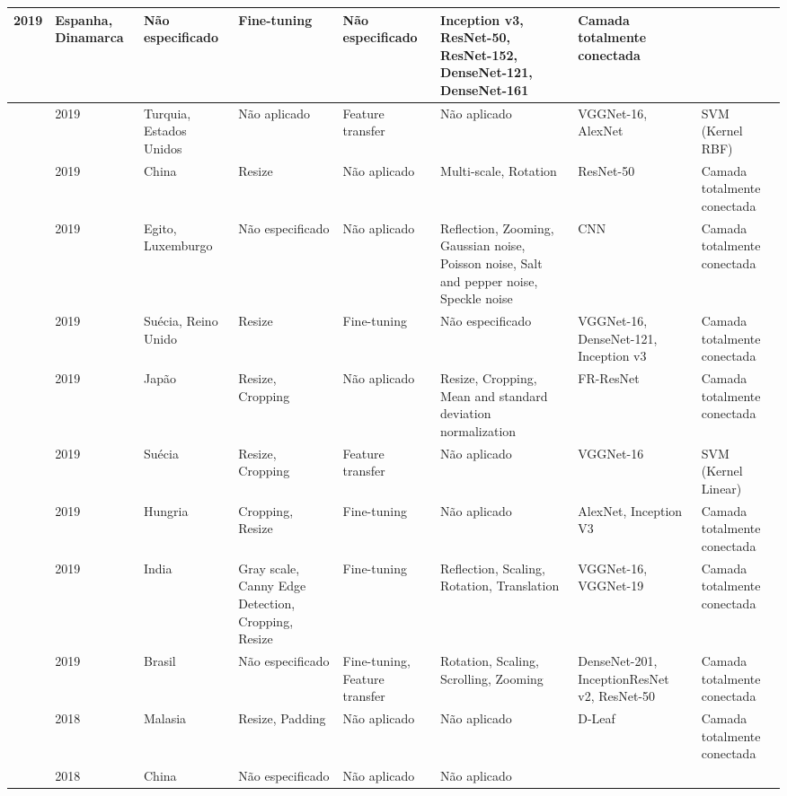 \documentclass[
	12pt,				%
	oneside,			%
	a4paper,			%
	english,			%
	brazil				%
	]{abntex2ppgsi}
\begin{document}
\begin{landscape}
\begin{OnehalfSpacing}
\begin{footnotesize}
\begin{longtable}{|p{2.3cm}|p{1.3cm}|p{2cm}|p{2.6cm}|p{2.4cm}|p{4.3cm}|p{4.3cm}|p{2.5cm}|}
  2019 &
  Espanha, Dinamarca &
  Não especificado &
  Fine-tuning &
  Não especificado &
  Inception v3, ResNet-50, ResNet-152, DenseNet-121, DenseNet-161 &
  Camada totalmente conectada \\ \hline
\cite{cibuk2019efficient} &
  2019 &
  Turquia, Estados Unidos &
  Não aplicado &
  Feature transfer &
  Não aplicado &
  VGGNet-16, AlexNet &
  SVM (Kernel RBF) \\ \hline
\cite{li2019effective} &
  2019 &
  China &
  Resize &
  Não aplicado &
  Multi-scale, Rotation &
  ResNet-50 &
  Camada totalmente conectada \\ \hline
\cite{khalifa2019deep} &
  2019 &
  Egito, Luxemburgo &
  Não especificado &
  Não aplicado &
  Reflection, Zooming, Gaussian noise, Poisson noise, Salt and pepper noise, Speckle noise &
  CNN &
  Camada totalmente conectada \\ \hline
\cite{hsiang2019endless} &
  2019 &
  Suécia, Reino Unido &
  Resize &
  Fine-tuning &
  Não especificado &
  VGGNet-16, DenseNet-121, Inception v3 &
  Camada totalmente conectada \\ \hline
\cite{ren2019feature} &
  2019 &
  Japão &
  Resize, Cropping &
  Não aplicado &
  Resize, Cropping, Mean and standard deviation normalization &
  FR-ResNet &
  Camada totalmente conectada \\ \hline
\cite{valan2019automated} &
  2019 &
  Suécia &
  Resize, Cropping &
  Feature transfer &
  Não aplicado &
  VGGNet-16 &
  SVM (Kernel Linear) \\ \hline
\cite{gyires2019deep} &
  2019 &
  Hungria &
  Cropping, Resize &
  Fine-tuning &
  Não aplicado &
  AlexNet, Inception V3 &
  Camada totalmente conectada \\ \hline
\cite{thenmozhi2019crop} &
  2019 &
  India &
  Gray scale, Canny Edge Detection, Cropping, Resize &
  Fine-tuning &
  Reflection, Scaling, Rotation, Translation &
  VGGNet-16, VGGNet-19 &
  Camada totalmente conectada \\ \hline
\cite{tetila2019deep} &
  2019 &
  Brasil &
  Não especificado &
  Fine-tuning, Feature transfer &
  Rotation, Scaling, Scrolling, Zooming &
  DenseNet-201, InceptionResNet v2, ResNet-50 &
  Camada totalmente conectada \\ \hline
\cite{wei2018deep} &
  2018 &
  Malasia &
  Resize, Padding &
  Não aplicado &
  Não aplicado &
  D-Leaf &
  Camada totalmente conectada \\ \hline
\cite{zhu2018method} &
  2018 &
  China &
  Não especificado &
  Não aplicado &
  Não aplicado &

\end{longtable}
\end{footnotesize}
\end{OnehalfSpacing}
\end{landscape}
\end{document}
